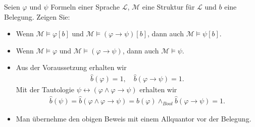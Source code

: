 
\begin{exercise}[85]

Seien $\varphi$ und $\psi$ Formeln einer Sprache $\mathscr{L}$, $\mathscr{M}$
eine Struktur für $\mathscr{L}$ und $b$ eine Belegung. Zeigen Sie:
\begin{itemize}
  \item Wenn $\mathscr{M} \vDash \varphi[b]$ und
  $\mathscr{M} \vDash (\varphi \rightarrow \psi)[b]$, dann auch
  $\mathscr{M} \vDash \psi[b]$.
  \item Wenn $\mathscr{M} \vDash \varphi$ und
  $\mathscr{M} \vDash (\varphi \rightarrow \psi)$, dann auch
  $\mathscr{M} \vDash \psi$.
\end{itemize}

\end{exercise}


\begin{solution}

\phantom{}
\begin{itemize}
  \item Aus der Voraussetzung erhalten wir
  \begin{align*}
    \hat{b}(\varphi) = 1, \quad \hat{b}(\varphi \rightarrow \psi) = 1.
  \end{align*}
  Mit der Tautologie $\psi \leftrightarrow (\varphi \land \varphi \rightarrow \psi)$ erhalten wir
  \begin{align*}
    \hat{b}(\psi) =  \hat{b}(\varphi \land \varphi \rightarrow \psi)
    = \hat{b}(\varphi) \land_{Bool} \hat{b}(\varphi \rightarrow \psi) = 1.
  \end{align*}
  \item Man übernehme den obigen Beweis mit einem Allquantor vor der Belegung.
\end{itemize}

\end{solution}

